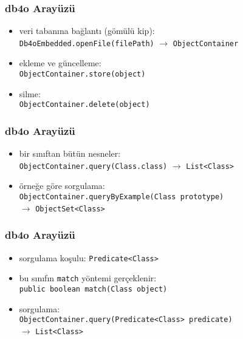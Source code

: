 \documentclass[dvipsnames]{beamer}
\theoremstyle{definition}
\theoremstyle{example}
\theoremstyle{plain}
\begin{document}
\begin{frame}
  \frametitle{db4o Arayüzü}

  \begin{itemize}
    \item veri tabanına bağlantı (gömülü kip):\\
      \lstinline!Db4oEmbedded.openFile(filePath)!
        $\rightarrow$ \lstinline!ObjectContainer!

    \pause
    \medskip
    \item ekleme ve güncelleme:\\
      \lstinline!ObjectContainer.store(object)!
    \item silme:\\
      \lstinline!ObjectContainer.delete(object)!
  \end{itemize}
\end{frame}

\begin{frame}
  \frametitle{db4o Arayüzü}

  \begin{itemize}
    \item bir sınıftan bütün nesneler:\\
      \lstinline!ObjectContainer.query(Class.class)!
       $\rightarrow$ \lstinline!List<Class>!

    \pause
    \medskip
    \item örneğe göre sorgulama:\\
      \lstinline!ObjectContainer.queryByExample(Class prototype)!\\
       $\rightarrow$ \lstinline!ObjectSet<Class>!
  \end{itemize}
\end{frame}

\begin{frame}
  \frametitle{db4o Arayüzü}

  \begin{itemize}
    \item sorgulama koşulu: \lstinline!Predicate<Class>!
    \item bu sınıfın \lstinline!match! yöntemi gerçeklenir:\\
      \lstinline!public boolean match(Class object)!

    \pause
    \medskip
    \item sorgulama:\\
      \lstinline!ObjectContainer.query(Predicate<Class> predicate)!\\
      $\rightarrow$ \lstinline!List<Class>!
  \end{itemize}
\end{frame}
\end{document}
